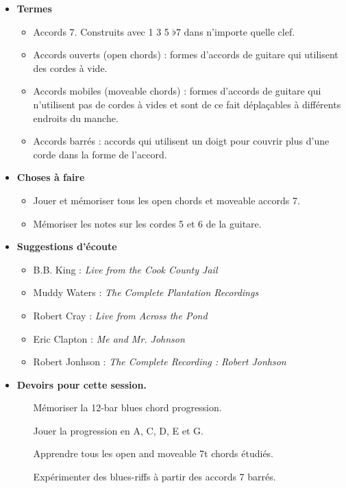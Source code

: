 \documentclass[a4paper]{book}
\begin{document}
	
	\begin{itemize}
	\item \textbf{Termes}
	\begin{itemize}
		\item Accords 7. Construits avec 1 3 5 $\flat$7 dans n'importe quelle clef.
		\item Accords ouverts (open chords) : formes d'accords de guitare qui utilisent des cordes à vide.
		\item Accords mobiles (moveable chords) : formes d'accords de guitare qui n'utilisent pas de cordes à vides et sont de ce fait déplaçables à différents endroits du manche.
		\item Accords barrés : accords qui utilisent un doigt pour couvrir plus d'une corde dans la forme de l'accord.
		\end{itemize}
	\end{itemize}

	\begin{itemize}
	\item \textbf{Choses à faire}
		\begin{itemize}
		\item Jouer et m\'emoriser tous les open chords et moveable accords 7.
		\item M\'emoriser les notes sur les cordes 5 et 6 de la guitare.
		\end{itemize}
	\end{itemize}
	
	\begin{itemize}
	\item \textbf{Suggestions d'écoute}
		\begin{itemize}
		\item B.B. King : \emph{Live from the Cook County Jail}
		\item Muddy Waters : \emph{The Complete Plantation Recordings}
		\item Robert Cray : \emph{Live from Across the Pond}
		\item Eric Clapton : \emph{Me and Mr. Johnson}
		\item Robert Jonhson : \emph{The Complete Recording : Robert Jonhson}
		\end{itemize}
	\end{itemize}

	


	\begin{itemize}
	\item \textbf{Devoirs pour cette session.}
		\begin{itemize}
		\item[Mémoriser la 12-bar blues chord progression.]
		\item[Jouer la progression en A, C, D, E et G.]
		\item[Apprendre tous les open and moveable 7t chords étudiés.]
		\item[Expérimenter des blues-riffs à partir des accords 7 barrés.]
		\end{itemize}
	\end{itemize}
\end{document}
